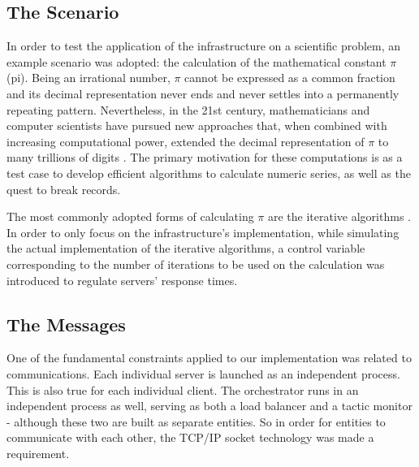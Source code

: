 \documentclass[12pt]{article}
\begin{document}
\subsection{The Scenario} \label{scenario} %

In order to test the application of the infrastructure on a scientific problem, an example scenario was adopted: the calculation of the mathematical constant $\pi$ (pi).
Being an irrational number, $\pi$ cannot be expressed as a common fraction and its decimal representation never ends and never settles into a permanently repeating pattern.
Nevertheless, in the 21st century, mathematicians and computer scientists have pursued new approaches that, when combined with increasing computational power, 
extended the decimal representation of $\pi$ to many trillions of digits \cite{pisky}.
The primary motivation for these computations is as a test case to develop efficient algorithms to calculate numeric series, as well as the quest to break records.

The most commonly adopted forms of calculating $\pi$ are the iterative algorithms \cite{jorg}.
In order to only focus on the infrastructure's implementation, while simulating the actual implementation of the iterative algorithms, a control variable 
corresponding to the number of iterations to be used on the calculation was introduced to regulate servers' response times. 

\subsection{The Messages} \label{messages} %

One of the fundamental constraints applied to our implementation was related to communications.
Each individual server is launched as an independent process.
This is also true for each individual client.
The orchestrator runs in an independent process as well, serving as both a load balancer and a tactic monitor - although these two are built as separate entities.
So in order for entities to communicate with each other, the TCP/IP socket technology was made a requirement. 
\end{document}
